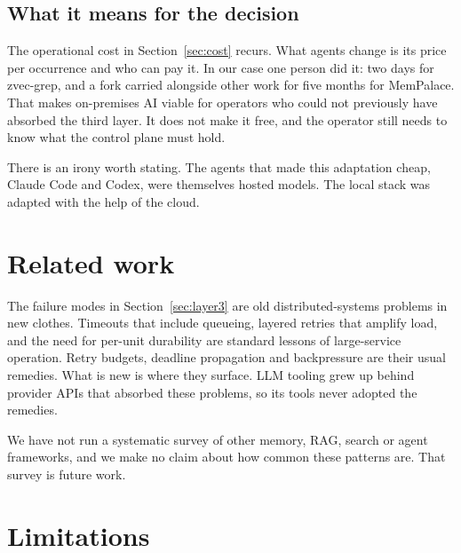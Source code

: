 \documentclass[11pt]{article}
\begin{document}
\subsection{What it means for the decision}

The operational cost in Section~\ref{sec:cost} recurs. What agents change is its price per occurrence
and who can pay it. In our case one person did it: two days for zvec-grep, and a fork carried
alongside other work for five months for MemPalace. That makes on-premises AI viable for operators
who could not previously have absorbed the third layer. It does not make it free, and the operator
still needs to know what the control plane must hold.

There is an irony worth stating. The agents that made this adaptation cheap, Claude Code and Codex,
were themselves hosted models. The local stack was adapted with the help of the cloud.

\section{Related work}
\label{sec:related}

The failure modes in Section~\ref{sec:layer3} are old distributed-systems problems in new clothes.
Timeouts that include queueing, layered retries that amplify load, and the need for per-unit
durability are standard lessons of large-service operation. Retry budgets, deadline propagation and
backpressure are their usual remedies. What is new is where they surface. LLM tooling grew up behind
provider APIs that absorbed these problems, so its tools never adopted the remedies.

We have not run a systematic survey of other memory, RAG, search or agent frameworks, and we make no
claim about how common these patterns are. That survey is future work.

\section{Limitations}
\label{sec:limitations}
\end{document}
